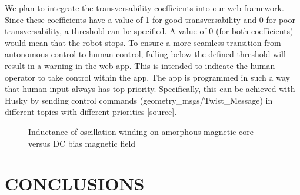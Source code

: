 \documentclass[letterpaper, 10 pt, conference]{ieeeconf}  %
\begin{document}
We plan to integrate the transversability coefficients into our web framework. Since these coefficients have a value of 1 for good transversability and 0 for poor transversability, a threshold can be specified. 
A value of 0 (for both coefficients) would mean that the robot stops. To ensure a more seamless transition from autonomous control to human control, falling below the defined threshold will result in a warning in the web app.
This is intended to indicate the human operator to take control within the app. The app is programmed in such a way that human input always has top priority. Specifically, this can be achieved with Husky by sending control commands (geometry\_msgs/Twist\_Message) in different topics with different priorities [source]. 




   \begin{figure}[thpb]
      \centering
      \caption{Inductance of oscillation winding on amorphous
       magnetic core versus DC bias magnetic field}
      \label{figurelabel}
   \end{figure}
   



\section{CONCLUSIONS}


\addtolength{\textheight}{-12cm}   %
\end{document}
